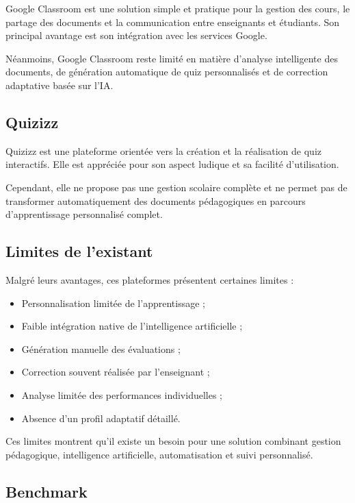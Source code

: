 \documentclass[12pt,a4paper]{report}
\begin{document}
Google Classroom est une solution simple et pratique pour la gestion des cours,
le partage des documents et la communication entre enseignants et étudiants. Son
principal avantage est son intégration avec les services Google.

Néanmoins, Google Classroom reste limité en matière d'analyse intelligente des
documents, de génération automatique de quiz personnalisés et de correction
adaptative basée sur l'IA.

\subsection{Quizizz}

Quizizz est une plateforme orientée vers la création et la réalisation de quiz
interactifs. Elle est appréciée pour son aspect ludique et sa facilité
d'utilisation.

Cependant, elle ne propose pas une gestion scolaire complète et ne permet pas
de transformer automatiquement des documents pédagogiques en parcours
d'apprentissage personnalisé complet.

\subsection{Limites de l'existant}

Malgré leurs avantages, ces plateformes présentent certaines limites :

\begin{itemize}
    \item Personnalisation limitée de l'apprentissage ;
    \item Faible intégration native de l'intelligence artificielle ;
    \item Génération manuelle des évaluations ;
    \item Correction souvent réalisée par l'enseignant ;
    \item Analyse limitée des performances individuelles ;
    \item Absence d'un profil adaptatif détaillé.
\end{itemize}

Ces limites montrent qu'il existe un besoin pour une solution combinant gestion
pédagogique, intelligence artificielle, automatisation et suivi personnalisé.

\subsection{Benchmark}
\end{document}
